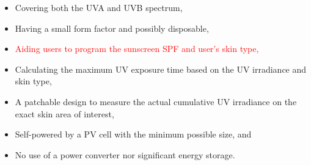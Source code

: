 \documentclass[onecolumn]{IEEEconf}
\begin{document}
\begin{description}
\begin{itemize}
\item Covering both the UVA and UVB spectrum,
\item Having a small form factor and possibly disposable,
\item \textcolor{red}{Aiding users to program the sunscreen SPF and user's skin type,}
\item Calculating the maximum UV exposure time based on the UV irradiance and skin type,
\item A patchable design to measure the actual cumulative UV irradiance on the exact skin area of interest,
\item Self-powered by a PV cell with the minimum possible size, and
\item No use of a power converter nor significant energy storage.
\end{itemize}

\end{description}

\pagebreak
\end{document}
